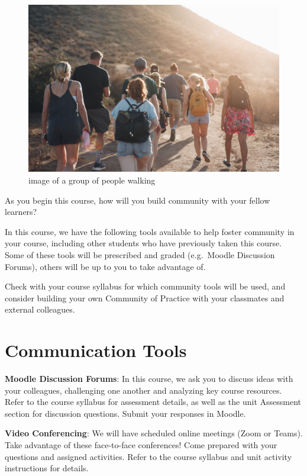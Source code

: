 \documentclass[
]{book}
\begin{document}
\begin{figure}
\centering
\includegraphics{assets/community/luke-porter-NEqEC7qa9FM-unsplash.jpg}
\caption{image of a group of people walking}
\end{figure}

As you begin this course, how will you build community with your fellow learners?

In this course, we have the following tools available to help foster community in your course, including other students who have previously taken this course. Some of these tools will be prescribed and graded (e.g.~Moodle Discussion Forums), others will be up to you to take advantage of.

Check with your course syllabus for which community tools will be used, and consider building your own Community of Practice with your classmates and external colleagues.

\hypertarget{communication-tools}{%
\section*{Communication Tools}\label{communication-tools}}

\textbf{Moodle Discussion Forums}: In this course, we ask you to discuss ideas with your colleagues, challenging one another and analyzing key course resources. Refer to the course syllabus for assessment details, as well as the unit Assessment section for discussion questions. Submit your responses in Moodle.

\textbf{Video Conferencing}: We will have scheduled online meetings (Zoom or Teams). Take advantage of these face-to-face conferences! Come prepared with your questions and assigned activities. Refer to the course syllabus and unit activity instructions for details.
\end{document}
